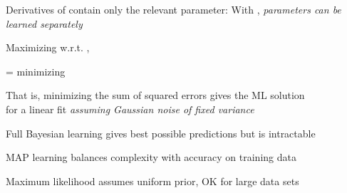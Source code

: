 \documentclass{article}
\begin{document}
\begin{huge}

Derivatives of  contain only the relevant parameter:
\mat{\[\begin{array}{rclcl}
\displaystyle \frac{\partial L}{\partial\theta} &=& \displaystyle \frac{c}{\theta} - \displaystyle\frac{\ell}{1-\theta} = 0                  & \qquad \implies & \theta = \displaystyle \frac{c}{c+\ell} 
\end{array}\]}%
\mat{\[\begin{array}{rclcl}
\displaystyle \frac{\partial L}{\partial\theta_1} &=& \displaystyle\frac{r_c}{\theta_1} - \displaystyle\frac{g_c}{1-\theta_1} = 0           & \qquad \implies & \theta_1 = \displaystyle\frac{r_c}{r_c+g_c} 
\end{array}\]}%
\mat{\[\begin{array}{rclcl}
\displaystyle \frac{\partial L}{\partial\theta_2} &=& \displaystyle\frac{r_{\ell}}{\theta_2} - \displaystyle\frac{g_{\ell}}{1-\theta_2} = 0 & \qquad \implies & \theta_2 = \displaystyle\frac{r_{\ell}}{r_{\ell}+g_{\ell}}
\end{array}\]}%
With , \emph{parameters can be learned separately}






Maximizing  w.r.t. , 

= minimizing 

That is, minimizing the sum of squared errors gives the ML solution\\
for a linear fit \emph{assuming Gaussian noise of fixed variance}




Full Bayesian learning gives best possible predictions but is intractable

MAP learning balances complexity with accuracy on training data 

Maximum likelihood assumes uniform prior, OK for large data sets


\end{huge}
\end{document}
